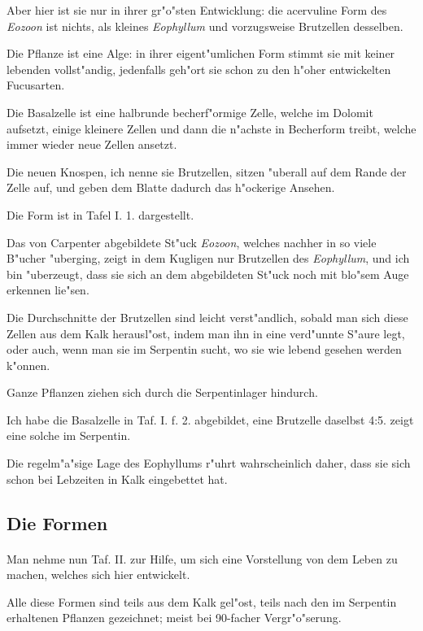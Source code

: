 \documentclass[a4paper, 11pt, oneside, german]{article}
\begin{document}
Aber hier ist sie nur in ihrer gr"o"sten Entwicklung: die acervuline Form des \emph{Eozoon} ist nichts, als kleines \emph{Eophyllum} und vorzugsweise Brutzellen desselben.

Die Pflanze ist eine Alge: in ihrer eigent"umlichen Form stimmt sie mit keiner lebenden vollst"andig, jedenfalls geh"ort sie schon zu den h"oher entwickelten Fucusarten.

Die Basalzelle ist eine halbrunde becherf"ormige Zelle, welche im Dolomit aufsetzt, einige kleinere Zellen und dann die n"achste in Becherform treibt, welche immer wieder neue Zellen ansetzt.

Die neuen Knospen, ich nenne sie Brutzellen, sitzen "uberall auf dem Rande der Zelle auf, und geben dem Blatte dadurch das h"ockerige Ansehen.

Die Form ist in Tafel I. 1. dargestellt.

Das von Carpenter abgebildete St"uck \emph{Eozoon}, welches nachher in so viele B"ucher "uberging, zeigt in dem Kugligen nur Brutzellen des \emph{Eophyllum}, und ich bin "uberzeugt, dass sie sich an dem abgebildeten St"uck noch mit blo"sem Auge erkennen lie"sen.

Die Durchschnitte der Brutzellen sind leicht verst"andlich, sobald man sich diese Zellen aus dem Kalk herausl"ost, indem man ihn in eine verd"unnte S"aure legt, oder auch, wenn man sie im Serpentin sucht, wo sie wie lebend gesehen werden k"onnen.

Ganze Pflanzen ziehen sich durch die Serpentinlager hindurch.

Ich habe die Basalzelle in Taf. I. f. 2. abgebildet, eine Brutzelle daselbst 4:5. zeigt eine solche im Serpentin.

Die regelm"a"sige Lage des Eophyllums r"uhrt wahrscheinlich daher, dass sie sich schon bei Lebzeiten in Kalk eingebettet hat.
\clearpage
\subsection{Die Formen}
\paragraph{}
Man nehme nun Taf. II. zur Hilfe, um sich eine Vorstellung von dem Leben zu machen, welches sich hier entwickelt.

Alle diese Formen sind teils aus dem Kalk gel"ost, teils nach den im Serpentin erhaltenen Pflanzen gezeichnet; meist bei 90-facher Vergr"o"serung.
\end{document}
